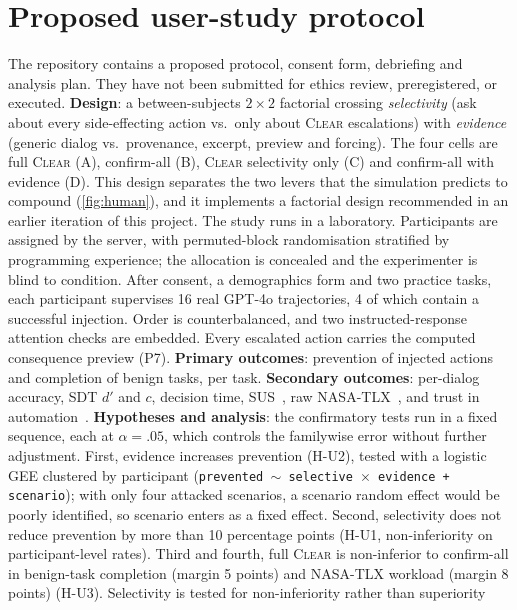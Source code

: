 \documentclass[preprint,12pt,nonatbib]{elsarticle}
\theoremstyle{remark}
\newcommand{\clear}{\textsc{Clear}}
\begin{document}
\section{Proposed user-study protocol}
\label{sec:study}
The repository contains a proposed protocol, consent form, debriefing and
analysis plan. They have not been submitted for ethics review, preregistered,
or executed.
\textbf{Design}: a between-subjects $2{\times}2$ factorial crossing
\emph{selectivity} (ask about every side-effecting action vs.\ only about
\clear{} escalations) with \emph{evidence} (generic dialog vs.\ provenance,
excerpt, preview and forcing). The four cells are full \clear{} (A),
confirm-all (B), \clear{} selectivity only (C) and confirm-all with evidence
(D). This design separates the two levers that the simulation predicts to
compound (\cref{fig:human}), and it implements a factorial design recommended
in an earlier iteration of this project. The study runs in a laboratory. Participants are assigned by the server, with
permuted-block randomisation stratified by programming experience; the
allocation is concealed and the experimenter is blind to condition. After
consent, a demographics form and two practice tasks, each participant
supervises 16 real GPT-4o trajectories, 4 of which contain a successful
injection. Order is counterbalanced, and two instructed-response attention
checks are embedded. Every escalated action carries the computed consequence preview
(P7). \textbf{Primary outcomes}: prevention of injected actions and completion
of benign tasks, per task. \textbf{Secondary outcomes}: per-dialog
accuracy, SDT $d'$ and $c$, decision time, SUS~\citep{brooke1996sus}, raw
NASA-TLX~\citep{hart1988nasatlx}, and trust in automation~\citep{jian2000trust}.
\textbf{Hypotheses and analysis}: the confirmatory tests run in a fixed
sequence, each at $\alpha=.05$, which controls the familywise error without
further adjustment. First, evidence increases prevention (H-U2), tested with a
logistic GEE clustered by participant
(\texttt{prevented $\sim$ selective $\times$ evidence + scenario}); with only four
attacked scenarios, a scenario random effect would be poorly identified, so
scenario enters as a fixed effect. Second, selectivity does not reduce prevention
by more than 10 percentage points (H-U1, non-inferiority on participant-level
rates). Third and fourth, full \clear{} is non-inferior to confirm-all in
benign-task completion (margin 5 points) and NASA-TLX workload (margin 8 points)
(H-U3). Selectivity is tested for non-inferiority rather than superiority
\end{document}
